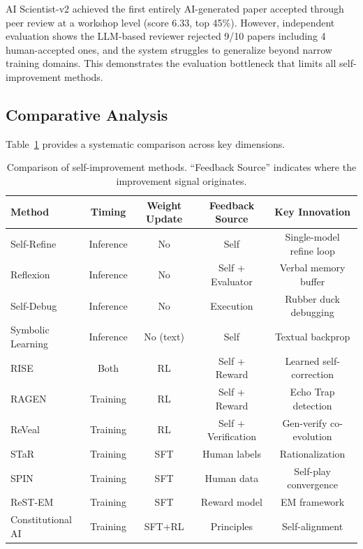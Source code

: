 AI Scientist-v2 achieved the first entirely AI-generated paper accepted through peer review at a workshop level (score 6.33, top 45\%). However, independent evaluation shows the LLM-based reviewer rejected 9/10 papers including 4 human-accepted ones, and the system struggles to generalize beyond narrow training domains. This demonstrates the evaluation bottleneck that limits all self-improvement methods.

\subsection{Comparative Analysis}
\label{sec:comparison}

Table~\ref{tab:self-improvement-comparison} provides a systematic comparison across key dimensions.

\begin{table}[t]
\centering
\caption{Comparison of self-improvement methods. ``Feedback Source'' indicates where the improvement signal originates.}
\label{tab:self-improvement-comparison}
\small
\begin{tabular}{@{}lcccc@{}}
\toprule
\textbf{Method} & \textbf{Timing} & \textbf{Weight Update} & \textbf{Feedback Source} & \textbf{Key Innovation} \\
\midrule
Self-Refine & Inference & No & Self & Single-model refine loop \\
Reflexion & Inference & No & Self + Evaluator & Verbal memory buffer \\
Self-Debug & Inference & No & Execution & Rubber duck debugging \\
Symbolic Learning & Inference & No (text) & Self & Textual backprop \\
RISE & Both & RL & Self + Reward & Learned self-correction \\
RAGEN & Training & RL & Self + Reward & Echo Trap detection \\
ReVeal & Training & RL & Self + Verification & Gen-verify co-evolution \\
\midrule
STaR & Training & SFT & Human labels & Rationalization \\
SPIN & Training & SFT & Human data & Self-play convergence \\
ReST-EM & Training & SFT & Reward model & EM framework \\
Constitutional AI & Training & SFT+RL & Principles & Self-alignment \\
\bottomrule
\end{tabular}
\end{table}


